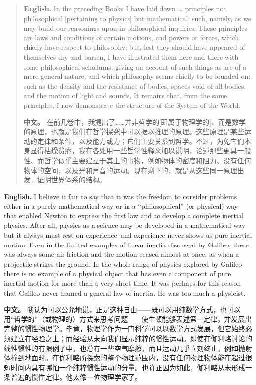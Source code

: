 \begin{quote}
\noindent\textbf{English.} In the preceding Books I have laid down \ldots{} principles not philosophical [pertaining to physics] but mathematical: such, namely, as we may build our reasonings upon in philosophical inquiries. These principles are laws and conditions of certain motions, and powers or forces, which chiefly have respect to philosophy; but, lest they should have appeared of themselves dry and barren, I have illustrated them here and there with some philosophical scholiums, giving an account of such things as are of a more general nature, and which philosophy seems chiefly to be founded on: such as the density and the resistance of bodies, spaces void of all bodies, and the motion of light and sounds. It remains that, from the same principles, I now demonstrate the structure of the System of the World.
\par\noindent\textbf{中文。} 在前几卷中，我提出了……并非哲学的[即属于物理学的]、而是数学的原理，也就是我们在哲学探究中可以据以推理的原理。这些原理是某些运动的定律和条件，以及能力或力；它们主要关系到哲学。不过，为免它们本身显得枯燥贫瘠，我在各处用一些哲学性释义加以说明，论述那些更具一般性、而哲学似乎主要建立于其上的事物，例如物体的密度和阻力、没有任何物体的空间，以及光和声音的运动。现在剩下的，就是从这些同一原理出发，证明世界体系的结构。
\end{quote}

\noindent\textbf{English.} I believe it fair to say that it was the freedom to consider problems either in a purely mathematical way or in a ``philosophical'' (or physical) way that enabled Newton to express the first law and to develop a complete inertial physics. After all, physics as a science may be developed in a mathematical way but it always must rest on experience--and experience never shows us pure inertial motion. Even in the limited examples of linear inertia discussed by Galileo, there was always some air friction and the motion ceased almost at once, as when a projectile strikes the ground. In the whole range of physics explored by Galileo there is no example of a physical object that has even a component of pure inertial motion for more than a very short time. It was perhaps for this reason that Galileo never framed a general law of inertia. He was too much a physicist.
\par\noindent\textbf{中文。} 我认为可以公允地说，正是这种自由——既可以用纯数学方式，也可以用“哲学的”（或物理的）方式来思考问题——使牛顿能够表述第一定律，并发展出完整的惯性物理学。毕竟，物理学作为一门科学可以以数学方式发展，但它始终必须建立在经验之上；而经验从未向我们显示纯粹的惯性运动。即使在伽利略讨论的线性惯性的有限例子中，也总有一些空气摩擦，而且运动几乎立刻终止，例如抛射体撞到地面时。在伽利略所探索的整个物理范围内，没有任何物理物体能在超过很短时间内具有哪怕一个纯粹惯性运动的分量。也许正因为如此，伽利略从未形成一条普遍的惯性定律。他太像一位物理学家了。
\medskip

